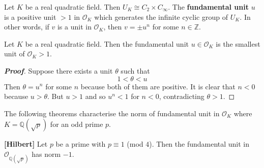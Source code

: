 \begin{definition} Let $K$ be a real quadratic field. Then $U_K \cong C_2 \times C_\infty$. The {\bf fundamental unit}
$u$ is a positive unit $>1$ in $\mathcal{O}_K$ which generates the infinite cyclic group of $U_K$. In other words,
if $v$ is a unit in $\mathcal{O}_K$, then $v=\pm u^n$ for some $n \in \mathbb{Z}$.
\end{definition}
\begin{proposition} Let $K$ be a real quadratic field. Then the fundamental unit $u \in \mathcal{O}_K$ is the smallest unit of $\mathcal{O}_K >1$.
\end{proposition}
\begin{proof}[\bf Proof] Suppose there exists a unit $\theta$ such that
$$1<\theta<u$$
Then $\theta=u^n$ for some $n$ because both of them are positive.
It is clear that $n<0$ because $u>\theta$. But $u>1$ and so $u^n<1$ for $n<0$, contradicting $\theta>1$.
\end{proof}
The following theorems characterise the norm of fundamental unit
in $\mathcal{O}_K$ where $K=\mathbb{Q}(\sqrt{p})$ for an odd prime $p$.
\begin{theorem}{\bf [Hilbert]}\label{H;Hilbert} Let $p$ be a prime with $p \equiv 1$ (mod $4$). Then the fundamental unit in $\mathcal{O}_{\mathbb{Q}(\sqrt{p})}$ has norm $-1$.
\end{theorem}
